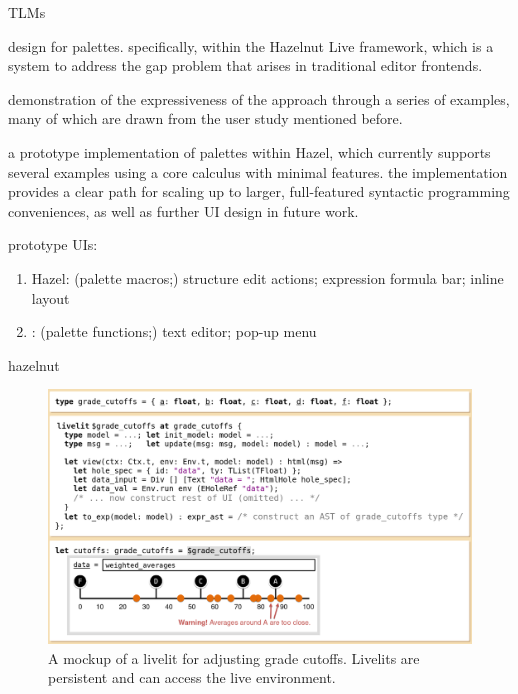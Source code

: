 \documentclass[acmsmall,review,anonymous,nonacm]{acmart}
\newcommand{\Hazel}{\textsf{Hazel}\xspace}
\theoremstyle{slplain}
\numberwithin{thm}{section}
\begin{document}
TLMs~\cite{TLMs}




design for palettes. specifically, within the Hazelnut Live framework,
which is a system to address the gap problem that arises in traditional editor
frontends.

demonstration of the expressiveness of the approach through a series of
examples, many of which are drawn from the user study mentioned before.

a prototype implementation of palettes within Hazel, which currently
supports several examples using a core calculus with minimal features. the
implementation provides a clear path for scaling up to larger, full-featured
syntactic programming conveniences, as well as further UI design in future work.

prototype UIs:

  \begin{enumerate}
    \item \Hazel{}: (palette macros;) structure edit actions; expression formula bar; inline layout
    \item \sns{}: (palette functions;) text editor; pop-up menu
  \end{enumerate}

hazelnut~\citep{Hazelnut,HazelnutLive}



\begin{figure}[t!]
  \begin{center}
  \includegraphics[width=34pc]{cutoffs-mockup.png}\end{center}
  \caption{A mockup of a livelit for adjusting grade cutoffs. Livelits are persistent and can access the live environment.}
  \label{fig:cutoffs}
  \end{figure}
  
\end{document}
